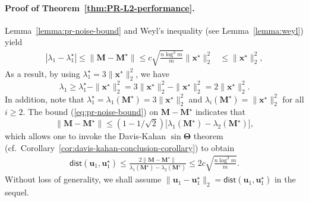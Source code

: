 \paragraph{Proof of Theorem~\ref{thm:PR-L2-performance}.}

Lemma~\ref{lemma:pr-noise-bound} and Weyl's inequality (see Lemma~\ref{lemma:weyl}) yield
%
\begin{align}
	 |\lambda_{1}-\lambda_{1}^{\star}|\leq\|\bm{M}-\bm{M}^{\star}\|\leq c\sqrt{\frac{n\log^3 m}{m}}\|\bm{x}^{\star}\|_{2}^{2}
	& \leq\|\bm{x}^{\star}\|_{2}^{2},\label{eq:pr-eig-pert}
\end{align}
%
As a result,  by using $\lambda_{1}^\star = 3\|\bm{x}^{\star}\|_{2}^{2}$, we have
%
\begin{equation}
	\lambda_{1} \geq \lambda_{1}^\star - \|\bm{x}^{\star}\|_{2}^{2} = 3\|\bm{x}^{\star}\|_{2}^{2}-\|\bm{x}^{\star}\|_{2}^{2} = 2\|\bm{x}^{\star}\|_{2}^{2}.
	\label{eq:pr-eig-lower-bound}
\end{equation}
%
In addition, note that $\lambda_{1}^{\star}=\lambda_{1}(\bm{M}^{\star})=3\|\bm{x}^{\star}\|_{2}^{2}$
and $\lambda_{i}(\bm{M}^{\star})=\|\bm{x}^{\star}\|_{2}^{2}$ for all $i\geq 2$. The
bound (\ref{eq:pr-noise-bound}) on $\bm{M}-\bm{M}^{\star}$ indicates that
%
\[
\|\bm{M}-\bm{M}^{\star}\|\leq(1-1/\sqrt{2})\big[ \lambda_{1}(\bm{M}^{\star})-\lambda_{2}(\bm{M}^{\star}) \big],
\]
%
which allows one to invoke the Davis-Kahan $\sin\bm{\Theta}$ theorem (cf.~Corollary~\ref{cor:davis-kahan-conclusion-corollary}) to obtain
%
\begin{align}
	\mathsf{dist}(\bm{u}_{1},\bm{u}_{1}^{\star})\leq\frac{2\|\bm{M}-\bm{M}^{\star}\|}{ \lambda_{1}(\bm{M}^{\star})-\lambda_{2}(\bm{M}^{\star}) }\leq2c\sqrt{\frac{n\log^3 m}{m}}.
	\label{eq:dist-u1-u1star-PR}
\end{align}
Without loss of generality, we shall assume $\|\bm{u}_{1}-\bm{u}_{1}^{\star}\|_{2}=\mathsf{dist}(\bm{u}_{1},\bm{u}_{1}^{\star})$ in the sequel.


